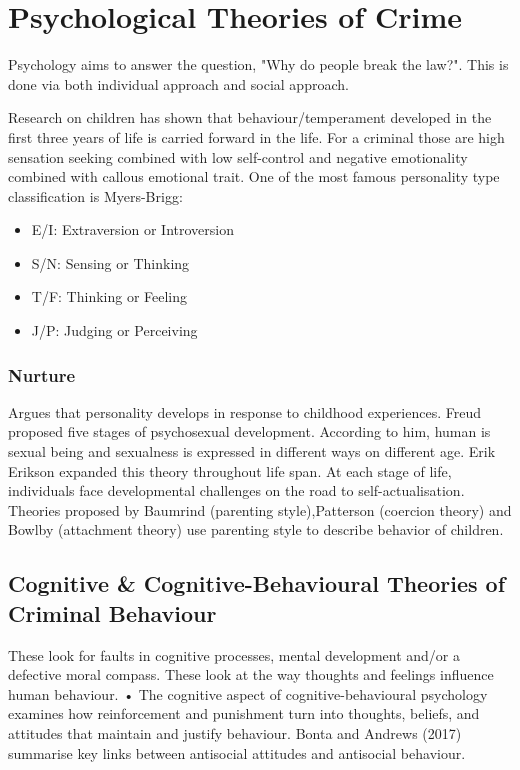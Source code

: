 \documentclass{article}
\begin{document}
\section{Psychological Theories of Crime}

Psychology aims to answer the question, "Why do people break the law?". This is done via both individual approach and social approach. 


Research on children has shown that behaviour/temperament developed in the first three years of life is carried forward in the life. For a criminal those are high sensation seeking  combined with low self-control and negative emotionality combined with callous emotional trait. One of the most famous personality type classification is Myers-Brigg:
\begin{itemize}
    \item E/I: Extraversion or Introversion
    \item S/N: Sensing or Thinking
    \item T/F: Thinking or Feeling
    \item J/P: Judging or Perceiving
\end{itemize}

\subsubsection*{Nurture}

Argues that personality develops in response to childhood experiences. Freud proposed five stages of psychosexual development. According to him, human is sexual being and sexualness is expressed in different ways on different age. Erik Erikson expanded this theory throughout life span. At each stage of life, individuals face developmental challenges on the road to self-actualisation. Theories proposed by Baumrind (parenting style),Patterson (coercion theory) and Bowlby (attachment theory) use parenting style to describe behavior of children.

\subsection{Cognitive \& Cognitive-Behavioural Theories of Criminal Behaviour}

These look for faults in cognitive processes, mental development and/or a defective moral compass. These look at the way thoughts and feelings influence human behaviour. 	• The cognitive aspect of cognitive-behavioural psychology examines how reinforcement and punishment turn into thoughts, beliefs, and attitudes that maintain and justify behaviour. Bonta and Andrews (2017) summarise key links between antisocial attitudes and antisocial behaviour.
\end{document}
